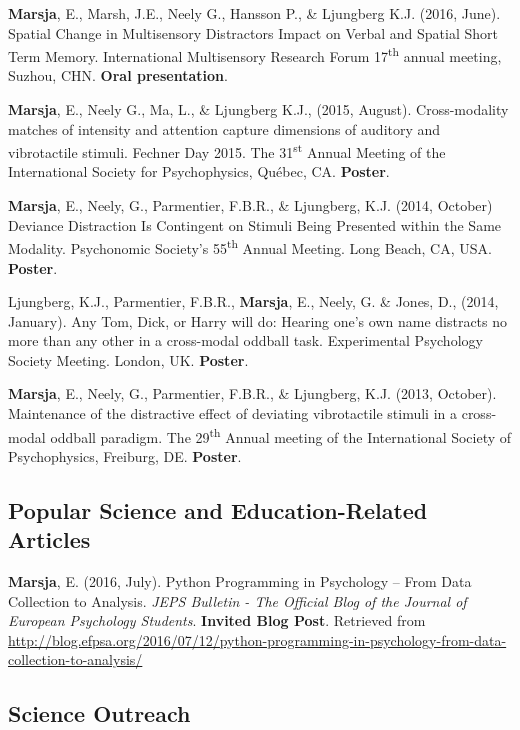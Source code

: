 \documentclass[]{article}
\begin{document}
\textbf{Marsja}, E., Marsh, J.E., Neely G., Hansson P., \& Ljungberg
K.J. (2016, June). Spatial Change in Multisensory Distractors Impact on
Verbal and Spatial Short Term Memory. International Multisensory
Research Forum 17\textsuperscript{th} annual meeting, Suzhou, CHN.
\textbf{Oral presentation}.

\textbf{Marsja}, E., Neely G., Ma, L., \& Ljungberg K.J., (2015,
August). Cross-modality matches of intensity and attention capture
dimensions of auditory and vibrotactile stimuli. Fechner Day 2015. The
31\textsuperscript{st} Annual Meeting of the International Society for
Psychophysics, Québec, CA. \textbf{Poster}.

\textbf{Marsja}, E., Neely, G., Parmentier, F.B.R., \& Ljungberg, K.J.
(2014, October) Deviance Distraction Is Contingent on Stimuli Being
Presented within the Same Modality. Psychonomic Society's
55\textsuperscript{th} Annual Meeting. Long Beach, CA, USA.
\textbf{Poster}.

Ljungberg, K.J., Parmentier, F.B.R., \textbf{Marsja}, E., Neely, G. \&
Jones, D., (2014, January). Any Tom, Dick, or Harry will do: Hearing
one's own name distracts no more than any other in a cross-modal oddball
task. Experimental Psychology Society Meeting. London, UK.
\textbf{Poster}.

\textbf{Marsja}, E., Neely, G., Parmentier, F.B.R., \& Ljungberg, K.J.
(2013, October). Maintenance of the distractive effect of deviating
vibrotactile stimuli in a cross-modal oddball paradigm. The
29\textsuperscript{th} Annual meeting of the International Society of
Psychophysics, Freiburg, DE. \textbf{Poster}.

\subsection{Popular Science and Education-Related
Articles}\label{popular-science-and-education-related-articles}

\textbf{Marsja}, E. (2016, July). Python Programming in Psychology --
From Data Collection to Analysis. \emph{JEPS Bulletin - The Official
Blog of the Journal of European Psychology Students}. \textbf{Invited
Blog Post}. Retrieved from
\sloppy \url{http://blog.efpsa.org/2016/07/12/python-programming-in-psychology-from-data-collection-to-analysis/}

\subsection{Science Outreach}\label{science-outreach}
\end{document}
